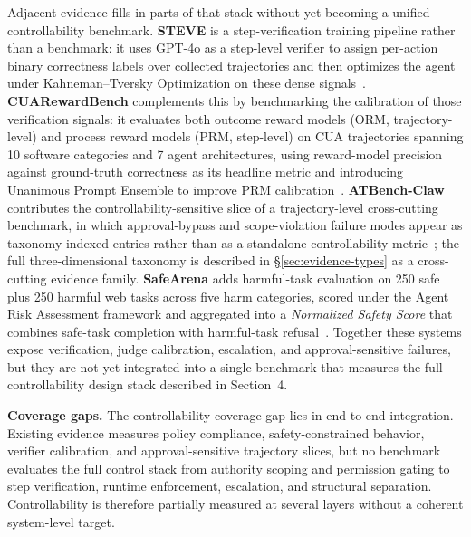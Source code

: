 Adjacent evidence fills in parts of that stack without yet becoming a unified controllability benchmark. \textbf{STEVE} is a step-verification training pipeline rather than a benchmark: it uses GPT-4o as a step-level verifier to assign per-action binary correctness labels over collected trajectories and then optimizes the agent under Kahneman--Tversky Optimization on these dense signals~\cite{steve2025}. \textbf{CUARewardBench} complements this by benchmarking the calibration of those verification signals: it evaluates both outcome reward models (ORM, trajectory-level) and process reward models (PRM, step-level) on CUA trajectories spanning 10 software categories and 7 agent architectures, using reward-model precision against ground-truth correctness as its headline metric and introducing Unanimous Prompt Ensemble to improve PRM calibration~\cite{cuarewardbench2025}. \textbf{ATBench-Claw} contributes the controllability-sensitive slice of a trajectory-level cross-cutting benchmark, in which approval-bypass and scope-violation failure modes appear as taxonomy-indexed entries rather than as a standalone controllability metric~\cite{atbenchclaw2026}; the full three-dimensional taxonomy is described in §\ref{sec:evidence-types} as a cross-cutting evidence family. \textbf{SafeArena} adds harmful-task evaluation on 250 safe plus 250 harmful web tasks across five harm categories, scored under the Agent Risk Assessment framework and aggregated into a \emph{Normalized Safety Score} that combines safe-task completion with harmful-task refusal~\cite{safearena2025}. Together these systems expose verification, judge calibration, escalation, and approval-sensitive failures, but they are not yet integrated into a single benchmark that measures the full controllability design stack described in Section~4.

\textbf{Coverage gaps.} The controllability coverage gap lies in end-to-end integration. Existing evidence measures policy compliance, safety-constrained behavior, verifier calibration, and approval-sensitive trajectory slices, but no benchmark evaluates the full control stack from authority scoping and permission gating to step verification, runtime enforcement, escalation, and structural separation. Controllability is therefore partially measured at several layers without a coherent system-level target.


